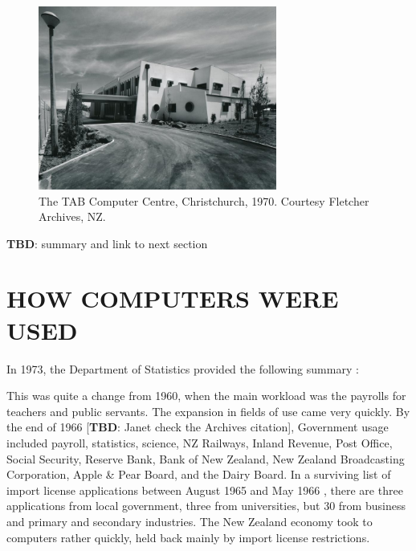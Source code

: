 \documentclass{IEEEcsmag}
\begin{document}
\begin{figure}
\centerline{\includegraphics[width=18.5pc]{TAB-Chch-1970.jpg}}
\caption{\label{TAB-ChCh}The TAB Computer Centre, Christchurch, 1970. Courtesy Fletcher Archives, NZ.}\vspace*{-5pt}
\end{figure}
{\bf TBD}: summary and link to next section
\vspace*{-8pt}
\section{HOW COMPUTERS WERE USED}

In 1973, the Department of Statistics provided the following summary \cite{Yearbook73}:

\begin{quotation}
\end{quotation}

This was quite a change from 1960, when the main workload was the payrolls for teachers and public servants. The expansion in fields of use came very quickly. By the end of 1966 \cite{Treasury-1974} [{\bf TBD}: Janet check the Archives citation], Government usage included payroll, statistics, science, NZ Railways, Inland Revenue, Post Office, Social Security, Reserve Bank, Bank of New Zealand, New Zealand Broadcasting Corporation, Apple \& Pear Board, and the Dairy Board. In a surviving list of import license applications between August 1965 and May 1966 \cite{Treasury-1974}, there are three applications from local government, three from universities, but 30 from business and primary and secondary industries. The New Zealand economy took to computers rather quickly, held back mainly by import license restrictions.
\end{document}
